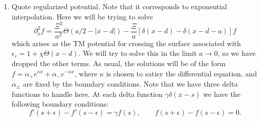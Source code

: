 \begin{enumerate}
  \item {Quote regularized potential.  Note that it corresponds to exponential interpolation.}
    Here we will be trying to solve
    \begin{equation}
      \partial_x^2f =\frac{\Xi^2}{a^2}\Theta(a/2-|x-d|) - \frac{\Xi}{a}[\delta(x-d)-\delta(x-d-a)]f
    \end{equation}
    which arises as the TM potential for crossing the surface associated with $\epsilon_r = 1+\chi\Theta(x-d)$.  We will try to solve this in the limit $a\rightarrow 0$, so we have dropped the other terms.  
    As usual, the solutions will be of the form $f = \alpha_+ e^{\kappa x}+\alpha_- e^{-\kappa x}$, where $\kappa$ is chosen to satisy the differential equation, and $\alpha_\pm$ are fixed by the boundary conditions.  Note that we have three delta functions to handle here.  At each delta function $\gamma \delta(x-s)$ we have the following boundary conditions:
    \begin{equation}
      f'(s+\epsilon)-f'(s-\epsilon) = \gamma f(s),\qquad f(s+\epsilon)-f(s-\epsilon) = 0.
    \end{equation}


\end{enumerate}
